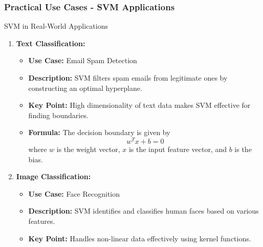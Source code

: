 \documentclass[aspectratio=169]{beamer}
\begin{document}
\begin{frame}[fragile]
    \frametitle{Practical Use Cases - SVM Applications}
    \begin{block}{SVM in Real-World Applications}
        \begin{enumerate}
            \item \textbf{Text Classification:}
            \begin{itemize}
                \item \textbf{Use Case:} Email Spam Detection
                \item \textbf{Description:} SVM filters spam emails from legitimate ones by constructing an optimal hyperplane.
                \item \textbf{Key Point:} High dimensionality of text data makes SVM effective for finding boundaries.
                \item \textbf{Formula:} The decision boundary is given by 
                \begin{equation}
                    w^T x + b = 0
                \end{equation}
                where \( w \) is the weight vector, \( x \) is the input feature vector, and \( b \) is the bias.
            \end{itemize}
            \item \textbf{Image Classification:}
            \begin{itemize}
                \item \textbf{Use Case:} Face Recognition
                \item \textbf{Description:} SVM identifies and classifies human faces based on various features.
                \item \textbf{Key Point:} Handles non-linear data effectively using kernel functions.
            \end{itemize}
        \end{enumerate}
    \end{block}
\end{frame}
\end{document}
